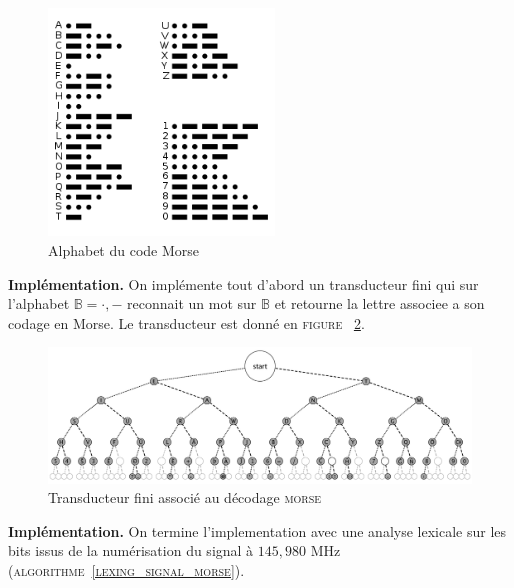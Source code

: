 \documentclass[twocolumn,pre,floats,aps,amsmath,amssymb]{revtex4}
\begin{document}
\begin{figure}[h]
  \includegraphics[width=6cm]{morse.png}
\caption{Alphabet du code Morse}
\label{fig:morse}
\end{figure}

\textbf{Impl\'ementation.} On impl\'emente tout d'abord un transducteur fini qui sur l'alphabet $\mathbb{B} = {\cdot, -}$ reconnait un mot sur $\mathbb{B}$ et retourne la lettre associee a son codage en Morse. Le transducteur est donn\'e en \textsc{figure} ~\ref{fig:transducteur_morse}.

\begin{figure}
  \includegraphics[width=17cm]{Morse_code_tree3.png}
\caption{Transducteur fini associ\'e au d\'ecodage \textsc{morse}~\cite{copyright_transducteur_morse}}
\label{fig:transducteur_morse}
\end{figure}

\textbf{Impl\'ementation.} On termine l'implementation avec une analyse lexicale sur les bits issus de la num\'erisation du signal \`a $145,980$ MHz (\textsc{algorithme~\ref{lexing_signal_morse}}).
\end{document}
